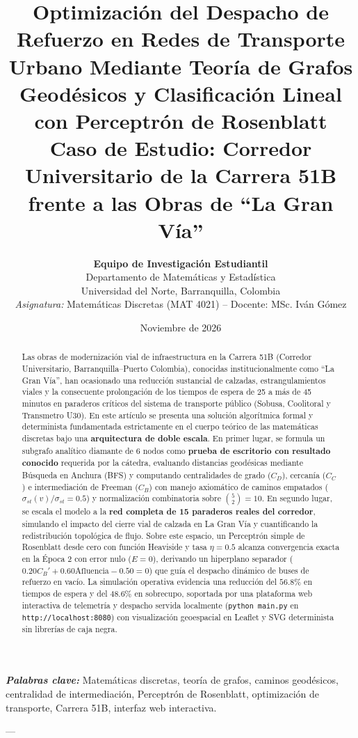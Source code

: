 \documentclass[11pt,letterpaper]{article}
\title{\textbf{Optimización del Despacho de Refuerzo en Redes de Transporte Urbano Mediante Teoría de Grafos Geodésicos y Clasificación Lineal con Perceptrón de Rosenblatt}\\
\large Caso de Estudio: Corredor Universitario de la Carrera 51B frente a las Obras de ``La Gran Vía''}
\author{
    \textbf{Equipo de Investigación Estudiantil}\\
    Departamento de Matemáticas y Estadística\\
    Universidad del Norte, Barranquilla, Colombia\\
    \textit{Asignatura:} Matemáticas Discretas (MAT 4021) -- Docente: MSc. Iván Gómez
}
\date{Noviembre de 2026}
\begin{document}
\maketitle

\begin{abstract}
Las obras de modernización vial de infraestructura en la Carrera 51B (Corredor Universitario, Barranquilla--Puerto Colombia), conocidas institucionalmente como ``La Gran Vía'', han ocasionado una reducción sustancial de calzadas, estrangulamientos viales y la consecuente prolongación de los tiempos de espera de 25 a más de 45 minutos en paraderos críticos del sistema de transporte público (Sobusa, Coolitoral y Transmetro U30). En este artículo se presenta una solución algorítmica formal y determinista fundamentada estrictamente en el cuerpo teórico de las matemáticas discretas bajo una \textbf{arquitectura de doble escala}. En primer lugar, se formula un subgrafo analítico diamante de 6 nodos como \textbf{prueba de escritorio con resultado conocido} requerida por la cátedra, evaluando distancias geodésicas mediante Búsqueda en Anchura (BFS) y computando centralidades de grado ($C_D$), cercanía ($C_C$) e intermediación de Freeman ($C_B$) con manejo axiomático de caminos empatados ($\sigma_{st}(v)/\sigma_{st} = 0.5$) y normalización combinatoria sobre $\binom{5}{2}=10$. En segundo lugar, se escala el modelo a la \textbf{red completa de 15 paraderos reales del corredor}, simulando el impacto del cierre vial de calzada en La Gran Vía y cuantificando la redistribución topológica de flujo. Sobre este espacio, un Perceptrón simple de Rosenblatt desde cero con función Heaviside y tasa $\eta = 0.5$ alcanza convergencia exacta en la Época 2 con error nulo ($E=0$), derivando un hiperplano separador ($0.20 C_B' + 0.60 \text{Afluencia} - 0.50 = 0$) que guía el despacho dinámico de buses de refuerzo en vacío. La simulación operativa evidencia una reducción del $56.8\%$ en tiempos de espera y del $48.6\%$ en sobrecupo, soportada por una plataforma web interactiva de telemetría y despacho servida localmente (\texttt{python main.py} en \texttt{http://localhost:8080}) con visualización geoespacial en Leaflet y SVG determinista sin librerías de caja negra.
\end{abstract}

\textbf{\textit{Palabras clave:}} Matemáticas discretas, teoría de grafos, caminos geodésicos, centralidad de intermediación, Perceptrón de Rosenblatt, optimización de transporte, Carrera 51B, interfaz web interactiva.

---
\end{document}
